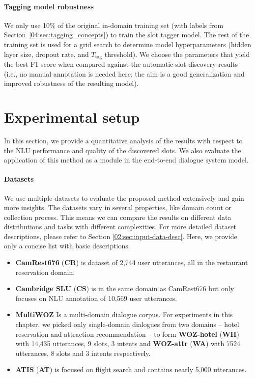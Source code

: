\paragraph{Tagging model robustness} 
We only use 10\% of the original in-domain training set (with labels from Section~\ref{04:sec:tagging_concepts}) to train the slot tagger model.
The rest of the training set is used for a grid search to determine model hyperparameters (hidden layer size, dropout rate, and $T_{\text{tag}}$ threshold). We choose the parameters that yield the best F1 score when compared against the automatic slot discovery results (i.e., no manual annotation is needed here; the aim is a good generalization and improved robustness of the resulting model).


\section{Experimental setup}
\label{04:sec:discovery_results}
In this section, we provide a quantitative analysis of the results with respect to the NLU performance and quality of the discovered slots.
We also evaluate the application of this method as a module in the end-to-end dialogue system model.
\paragraph{Datasets}
We use multiple datasets to evaluate the proposed method extensively and gain more insights.
The datasets vary in several properties, like domain count or collection process.
This means we can compare the results on different data distributions and tasks with different complexities.
For more detailed dataset descriptions, please refer to Section \ref{02:sec:input-data-desc}.
Here, we provide only a concise list with basic descriptions.
\begin{itemize}
    \item \textbf{CamRest676} (\textbf{CR}) is dataset of 2,744 user utterances, all in the restaurant reservation domain.
    \item \textbf{Cambridge SLU} (\textbf{CS}) is in the same domain as CamRest676 but only focuses on NLU annotation of  10,569 user utterances.
    \item \textbf{MultiWOZ} Is a multi-domain dialogue corpus. For experiments in this chapter, we picked only single-domain dialogues from two domains -- hotel reservation and attraction recommendation -- to form \textbf{WOZ-hotel} (\textbf{WH}) with 14,435 utterances, 9 slots, 3 intents and \textbf{WOZ-attr} (\textbf{WA}) with 7524 utterances, 8 slots and 3 intents respectively.
    \item \textbf{ATIS} (\textbf{AT}) is focused on flight search and contains nearly 5,000 utterances.
\end{itemize}
